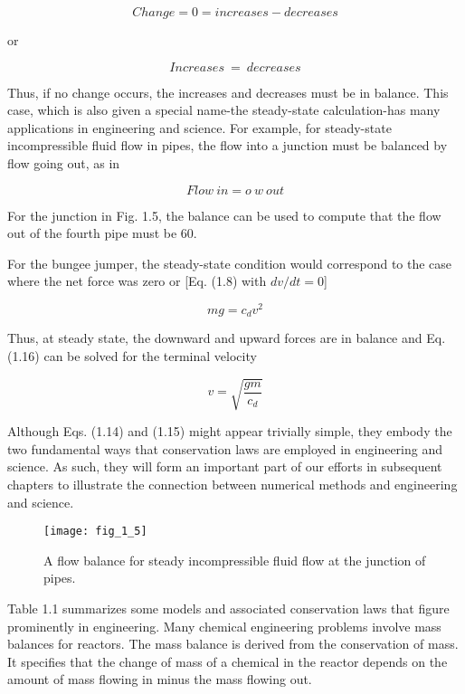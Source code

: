 \documentclass[../main.tex]{subfiles}
\begin{document}
$$ Change =  0  =  increases  −  decreases $$

or

\begin{equation}
	\tag{1.15}
	Increases \ = \ decreases
\end{equation}

Thus, if no change occurs, the increases and decreases must be in balance. This case, which
is also given a special name-the steady-state calculation-has many applications in engineering and science. For example, for steady-state incompressible fluid flow in pipes, the
flow into a junction must be balanced by flow going out, as in

\begin{equation}
	Flow \ in = o \ w \ out
\end{equation}

For the junction in Fig. 1.5, the balance can be used to compute that the flow out of the
fourth pipe must be 60.

For the bungee jumper, the steady-state condition would correspond to the case where
the net force was zero or [Eq. (1.8) with $dv/dt = 0$]

\begin{equation}
	mg =c_dv^2
\end{equation}

Thus, at steady state, the downward and upward forces are in balance and Eq. (1.16) can be
solved for the terminal velocity


$$v=\sqrt{\dfrac{gm}{c_d}}  $$

Although Eqs. (1.14) and (1.15) might appear trivially simple, they embody the two fundamental ways that conservation laws are employed in engineering and science. As such, they
will form an important part of our efforts in subsequent chapters to illustrate the connection
between numerical methods and engineering and science.


\begin{figure}[H]
	\centering
	\texttt{[image: fig\_1\_5]}
   \caption{\textsf{A flow balance for steady incompressible fluid flow at the junction of pipes.}}
   \label{fig_1.5}
\end{figure}

Table 1.1 summarizes some models and associated conservation laws that figure prominently in engineering. Many chemical engineering problems involve mass balances for
reactors. The mass balance is derived from the conservation of mass. It specifies that the
change of mass of a chemical in the reactor depends on the amount of mass flowing in
minus the mass flowing out.
\end{document}
